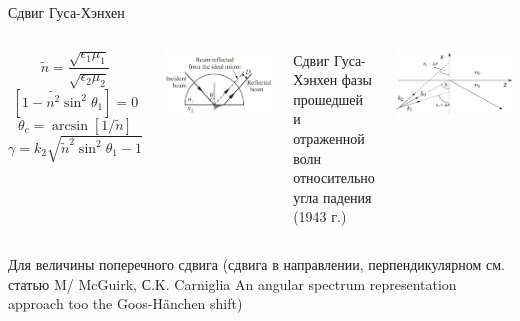 \documentclass[9pt, compress, xcolor=table]{beamer}
\begin{document}
\begin{frame}{Сдвиг Гуса-Хэнхен}
\begin{columns}[c]
\column{1.8in}

\begin{equation*}
\tilde{n} = \frac{\sqrt{\epsilon_1 \mu_1}}{\sqrt{\epsilon_2 \mu_2}}
\end{equation*}
\begin{equation*}
\left[1-\tilde{n^2} \sin^2 \theta_1\right] = 0
\end{equation*}
\begin{equation*}
\theta_c = \arcsin [1/ \tilde{n}]
\end{equation*}
\begin{equation*}
\gamma = k_2 \sqrt{\tilde{n}^2 \sin^2 \theta_1 - 1}
\end{equation*}

\begin{center}
\includegraphics[scale=0.14]{gh01}
\end{center}


\column{2.8in} Сдвиг Гуса-Хэнхен фазы прошедшей и отраженной волн относительно угла падения (1943
г.)
\begin{center}
\includegraphics[scale=0.12]{fig2_12}
\end{center}

\end{columns}

Для величины поперечного сдвига (сдвига в направлении, перпендикулярном см. статью M/ McGuirk, С.K. Carniglia An angular spectrum representation approach too the Goos-H\"{a}nchen shift)

\end{frame}
\end{document}
